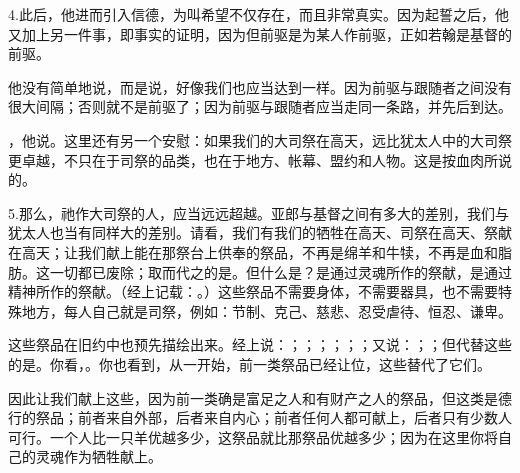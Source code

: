 4.\newline{}此后，他进而引入信德，为叫希望不仅存在，而且非常真实。因为起誓之后，他又加上另一件事，即事实的证明，因为但前驱是为某人作前驱，正如若翰是基督的前驱。\par

他没有简单地说，而是说，好像我们也应当达到一样。因为前驱与跟随者之间没有很大间隔；否则就不是前驱了；因为前驱与跟随者应当走同一条路，并先后到达。\par

，他说。这里还有另一个安慰：如果我们的大司祭在高天，远比犹太人中的大司祭更卓越，不只在于司祭的品类，也在于地方、帐幕、盟约和人物。这是按血肉所说的。\par

5.\newline{}那么，祂作大司祭的人，应当远远超越。亚郎与基督之间有多大的差别，我们与犹太人也当有同样大的差别。请看，我们有我们的牺牲在高天、司祭在高天、祭献在高天；让我们献上能在那祭台上供奉的祭品，不再是绵羊和牛犊，不再是血和脂肪。这一切都已废除；取而代之的是。但什么是？是通过灵魂所作的祭献，是通过精神所作的祭献。（经上记载：。）这些祭品不需要身体，不需要器具，也不需要特殊地方，每人自己就是司祭，例如：节制、克己、慈悲、忍受虐待、恒忍、谦卑。\par

这些祭品在旧约中也预先描绘出来。经上说：；；；；；；又说：；；但代替这些的是。你看，。你也看到，从一开始，前一类祭品已经让位，这些替代了它们。\par

因此让我们献上这些，因为前一类确是富足之人和有财产之人的祭品，但这类是德行的祭品；前者来自外部，后者来自内心；前者任何人都可献上，后者只有少数人可行。一个人比一只羊优越多少，这祭品就比那祭品优越多少；因为在这里你将自己的灵魂作为牺牲献上。\par

